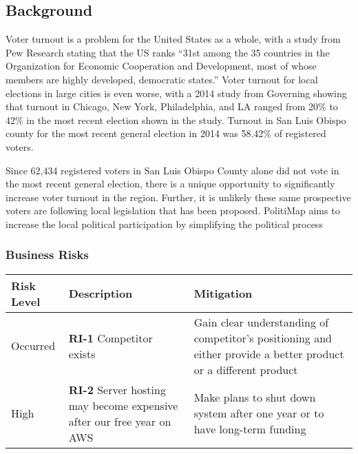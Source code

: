 % 
\subsection{Background}
Voter turnout is a problem for the United States as a whole, with a
study from Pew Research stating that the US ranks “31st among the 35
countries in the Organization for Economic Cooperation and
Development, most of whose members are highly developed, democratic
states.”  \cite{pew} Voter turnout for local elections in large cities
is even worse, with a 2014 study from Governing showing that turnout
in Chicago, New York, Philadelphia, and LA ranged from 20\% to 42\% in
the most recent election shown in the study. \cite{governing} Turnout
in San Luis Obispo county for the most recent general election in 2014
was 58.42\% of registered voters. \cite{slocounty}

Since 62,434 registered voters in San Luis Obispo County alone did not vote in the most recent
general election, there is a unique opportunity to significantly increase
voter turnout in the region. Further, it is unlikely these same prospective voters are following local legislation that has been proposed. PolitiMap aims to increase the local political participation by simplifying the political process

\subsubsection{Business Risks}
\begin{tabu}{lXX}
  \toprule
  Risk Level & Description & Mitigation \\
  \midrule
  Occurred &
  \textbf{RI-1} Competitor exists &
  Gain clear
  understanding of competitor's positioning and either provide a
  better product or a different product\\

  High &
  \textbf{RI-2} Server hosting may become expensive after our
  free year on AWS &
  Make plans to shut down system after one year or to
  have long-term funding \\
  \bottomrule
\end{tabu}

